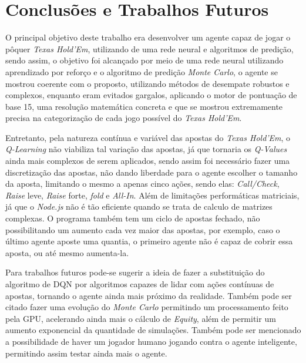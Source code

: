 \chapter{Conclusões e Trabalhos Futuros}
\label{chap:conclusoes-e-trabalhos-futuros}

O principal objetivo deste trabalho era desenvolver um agente capaz de jogar o pôquer \textit{Texas Hold'Em}, utilizando de uma rede neural e algoritmos de predição, sendo assim, o objetivo foi alcançado por meio de uma rede neural utilizando aprendizado por reforço e o algoritmo de predição \textit{Monte Carlo}, o agente se mostrou coerente com o proposto, utilizando métodos de desempate robustos e complexos, enquanto eram evitados gargalos, aplicando o motor de pontuação de base 15, uma resolução matemática concreta e que se mostrou extremamente precisa na categorização de cada jogo possível do \textit{Texas Hold'Em}.

Entretanto, pela natureza contínua e variável das apostas do \textit{Texas Hold'Em}, o \textit{Q-Learning} não viabiliza tal variação das apostas, já que tornaria os \textit{Q-Values} ainda mais complexos de serem aplicados, sendo assim foi necessário fazer uma discretização das apostas, não dando liberdade para o agente escolher o tamanho da aposta, limitando o mesmo a apenas cinco ações, sendo elas: \textit{Call/Check}, \textit{Raise} leve, \textit{Raise} forte, \textit{fold} e \textit{All-In}. Além de limitações performáticas matriciais, já que o \textit{Node.js} não é tão eficiente quando se trata de calculo de matrizes complexas. O programa também tem um ciclo de apostas fechado, não possibilitando um aumento cada vez maior das apostas, por exemplo, caso o último agente aposte uma quantia, o primeiro agente não é capaz de cobrir essa aposta, ou até mesmo aumenta-la.

Para trabalhos futuros pode-se sugerir a ideia de fazer a substituição do algoritmo de \gls{DQN} por algoritmos capazes de lidar com ações contínuas de apostas, tornando o agente ainda mais próximo da realidade. Também pode ser citado fazer uma evolução do \textit{Monte Carlo} permitindo um processamento feito pela \gls{GPU}, acelerando ainda mais o cálculo de \textit{Equity}, além de permitir um aumento exponencial da quantidade de simulações. Também pode ser mencionado a possibilidade de haver um jogador humano jogando contra o agente inteligente, permitindo assim testar ainda mais o agente.